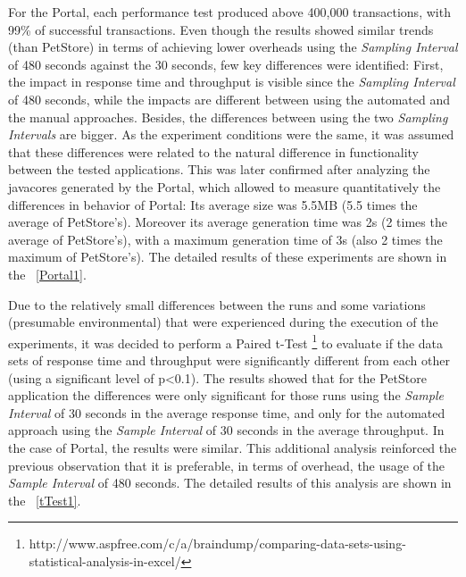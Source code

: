 \documentclass[runningheads,a4paper]{llncs}
\begin{document}
For the Portal, each performance test produced above 400,000 transactions,
with 99\% of successful transactions. Even though the results showed similar
trends (than PetStore) in terms of achieving lower overheads using the
\emph{Sampling Interval} of 480 seconds against the 30 seconds, few key 
differences were identified: First, the impact in response time and
throughput is visible since the \emph{Sampling Interval} of 480 seconds, 
while the impacts are different between using the automated and the manual
approaches. Besides, the differences between using the two \emph{Sampling Intervals} 
are bigger. As the experiment conditions were the same, it was assumed that these 
differences were related to the natural difference in functionality between the
tested applications. This was later confirmed after analyzing the javacores
generated by the Portal, which allowed to measure quantitatively the
differences in behavior of Portal: Its average size was 5.5MB (5.5 times the
average of PetStore's). Moreover its average generation time was 2s (2 times the 
average of PetStore's), with a maximum generation time of 3s (also 2 times the
maximum of PetStore's). The detailed results of these experiments are shown in the \tablename ~\ref{Portal1}.

Due to the relatively small differences between the runs and some variations
(presumable environmental) that were experienced during the execution of the
experiments, it was decided to perform a Paired t-Test
\footnote{http://www.aspfree.com/c/a/braindump/comparing-data-sets-using-statistical-analysis-in-excel/}
to evaluate if the data sets of response time and throughput were significantly
different from each other (using a significant level of p<0.1). The results
showed that for the PetStore application the differences were only significant for
those runs using the \emph{Sample Interval} of 30 seconds in the average
response time, and only for the automated approach using the \emph{Sample
Interval} of 30 seconds in the average throughput. In the case of Portal, the
results were similar. This additional analysis reinforced the
previous observation that it is preferable, in terms of overhead, the
usage of the \emph{Sample Interval} of 480 seconds. The detailed results of
this analysis are shown in the \tablename ~\ref{tTest1}.
\end{document}
